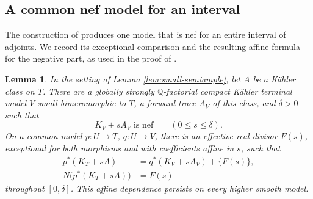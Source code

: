 \documentclass[11pt,a4paper]{article}
\newtheorem{lemma}[theorem]{Lemma}
\theoremstyle{definition}\newtheorem{definition}[theorem]{Definition}
\theoremstyle{remark}\newtheorem*{remark}{Remark}
\newcommand{\Q}{\mathbb Q}\newcommand{\C}{\mathbb C}
\begin{document}
\subsection{A common nef model for an interval}

The construction of \cite[Lemma~3.12]{OAI034} produces one model that
is nef for an entire interval of adjoints. We record its exceptional
comparison and the resulting affine formula for the negative part,
as used in the proof of \cite[Theorem~3.13]{OAI034}.

\begin{lemma}\label{lem:nef-interval}
In the setting of Lemma \ref{lem:small-semiample}, let $A$ be a Kähler class
on $T$. There are a globally strongly $\Q$-factorial compact Kähler
terminal model $V$ small bimeromorphic to $T$, a forward trace $A_V$
of this class, and $\delta>0$ such that
\[
 K_V+sA_V\text{ is nef}\qquad(0\le s\le\delta).
\]
On a common model $p:U\to T$, $q:U\to V$, there is an effective real divisor
$F(s)$, exceptional for both morphisms and with coefficients affine in $s$,
such that
\begin{equation}\label{eq:affine-N}
 \begin{aligned}
 p^*(K_T+sA)&=q^*(K_V+sA_V)+\{F(s)\},\\
 N\bigl(p^*(K_T+sA)\bigr)&=F(s)
 \end{aligned}
\end{equation}
throughout $[0,\delta]$. This affine dependence persists on every higher smooth
model.
\end{lemma}
\end{document}
